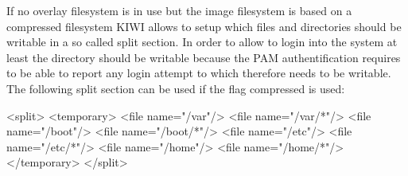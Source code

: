 If no overlay filesystem is in use but the image filesystem is based on
a compressed filesystem KIWI allows to setup which files and directories
should be writable in a so called split section. In order to allow to
login into the system at least the  directory should be writable
because the PAM authentification requires to be able to report any login
attempt to  which therefore needs to be writable. The
following split section can be used if the flag compressed
is used:  

\begin{xml}
<split>
   <temporary>
       <file name="/var"/>
       <file name="/var/*"/>
       <file name="/boot"/>
       <file name="/boot/*"/>
       <file name="/etc"/>
       <file name="/etc/*"/>
       <file name="/home"/>
       <file name="/home/*"/>
   </temporary>
</split>
\end{xml}

